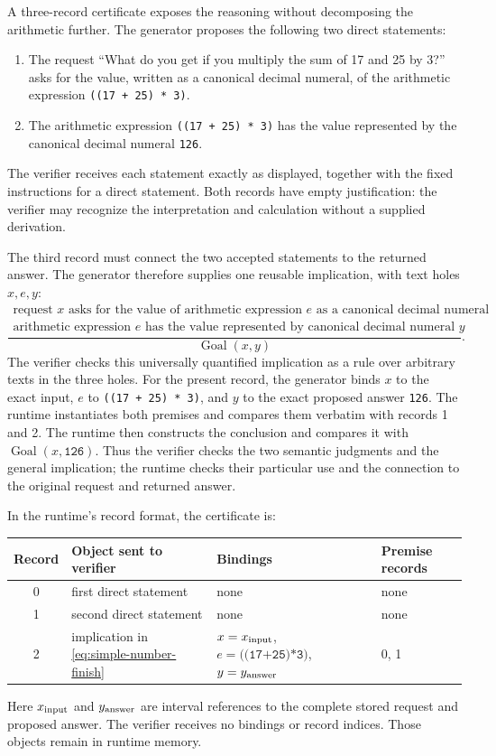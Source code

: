 \documentclass[11pt,twoside]{article}
\theoremstyle{definition}
\newcommand{\Goal}{\operatorname{Goal}}
\begin{document}
A three-record certificate exposes the reasoning without decomposing the
arithmetic further. The generator proposes the following two direct
statements:
\begin{enumerate}[label=\arabic*.,leftmargin=*]
\item The request ``What do you get if you multiply the sum of 17 and 25 by
3?'' asks for the value, written as a canonical decimal numeral, of the
arithmetic expression \texttt{((17 + 25) * 3)}.
\item The arithmetic expression \texttt{((17 + 25) * 3)} has the value
represented by the canonical decimal numeral \texttt{126}.
\end{enumerate}
The verifier receives each statement exactly as displayed, together with the
fixed instructions for a direct statement. Both records have empty justification:
the verifier may recognize the interpretation and calculation without a
supplied derivation.

The third record must connect the two accepted statements to the returned
answer. The generator therefore supplies one reusable implication, with text
holes $x,e,y$:
\begin{equation}
 \frac{\begin{array}{c}
 \text{request $x$ asks for the value of arithmetic expression $e$ as a canonical decimal numeral}\\
 \text{arithmetic expression $e$ has the value represented by canonical decimal numeral $y$}
 \end{array}}
 {\Goal(x,y)}.
\label{eq:simple-number-finish}
\end{equation}
The verifier checks this universally quantified implication as a rule over
arbitrary texts in the three holes. For the present record, the generator binds $x$ to
the exact input, $e$ to \texttt{((17 + 25) * 3)}, and $y$ to the exact proposed
answer \texttt{126}. The runtime instantiates both premises and compares them
verbatim with records 1 and 2. The runtime then constructs the conclusion and
compares it with $\Goal(x,\texttt{126})$. Thus the verifier checks the two
semantic judgments and the general implication; the runtime checks their
particular use and the connection to the original request and returned answer.

In the runtime's record format, the certificate is:
\begin{center}
\begin{tabular}{clll}
\toprule
Record & Object sent to verifier & Bindings & Premise records\\
\midrule
0 & first direct statement & none & none\\
1 & second direct statement & none & none\\
2 & implication in \cref{eq:simple-number-finish} & $x=x_{\rm input}$, $e=\texttt{((17+25)*3)}$, $y=y_{\rm answer}$ & 0, 1\\
\bottomrule
\end{tabular}
\end{center}
Here $x_{\rm input}$ and $y_{\rm answer}$ are interval references to the
complete stored request and proposed answer. The verifier receives no
bindings or record indices. Those objects remain in runtime memory.
\end{document}
